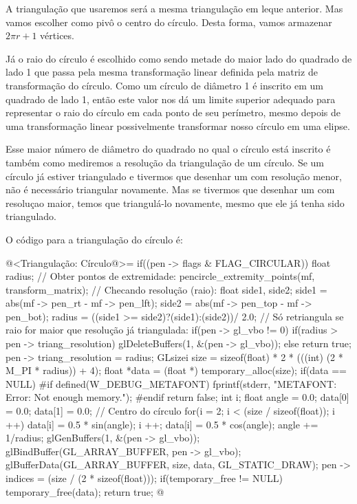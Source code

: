 {{{{{{A triangulação que usaremos será a mesma triangulação em leque
anterior. Mas vamos escolher como pivô o centro do círculo. Desta
forma, vamos armazenar $2\pi r + 1$ vértices.

Já o raio do círculo é escolhido como sendo metade do maior lado do
quadrado de lado 1 que passa pela mesma transformação linear definida
pela matriz de transformação do círculo. Como um círculo de diâmetro 1
é inscrito em um quadrado de lado 1, então este valor nos dá um limite
superior adequado para representar o raio do círculo em cada ponto de
seu perímetro, mesmo depois de uma transformação linear possivelmente
transformar nosso círculo em uma elipse.

Esse maior número de diâmetro do quadrado no qual o círculo está
inscrito é também como mediremos a resolução da triangulação de um
círculo. Se um círculo já estiver triangulado e tivermos que desenhar
um com resolução menor, não é necessário triangular novamente. Mas se
tivermos que desenhar um com resoluçao maior, temos que triangulá-lo
novamente, mesmo que ele já tenha sido triangulado.

O código para a triangulação do círculo é:

\iniciocodigo
@<Triangulação: Círculo@>=
if((pen -> flags & FLAG_CIRCULAR)){
  float radius;
  // Obter pontos de extremidade:
  pencircle_extremity_points(mf, transform_matrix);
  // Checando resolução (raio):
  {
    float side1, side2;
    side1 = abs(mf -> pen_rt - mf -> pen_lft);
    side2 = abs(mf -> pen_top - mf -> pen_bot);
    radius = ((side1 >= side2)?(side1):(side2))/ 2.0;
  }
  // Só retriangula se raio for maior que resolução já triangulada:
  if(pen -> gl_vbo != 0){
    if(radius > pen -> triang_resolution)
      glDeleteBuffers(1, &(pen -> gl_vbo));
    else
      return true;
  }
  pen -> triang_resolution = radius;
  GLsizei size = sizeof(float) * 2 * (((int) (2 * M_PI * radius)) + 4);
  float *data = (float *) temporary_alloc(size);
  if(data == NULL){
#if defined(W_DEBUG_METAFONT)
    fprintf(stderr, "METAFONT: Error: Not enough memory.\n");
#endif
    return false;
  }
  {
    int i;
    float angle = 0.0;
    data[0] = 0.0;
    data[1] = 0.0; // Centro do círculo
    for(i = 2; i < (size / sizeof(float)); i ++){
      data[i] = 0.5 * sin(angle);
      i ++;
      data[i] = 0.5 * cos(angle);
      angle += 1/radius;
    }
  }
  glGenBuffers(1, &(pen -> gl_vbo));
  glBindBuffer(GL_ARRAY_BUFFER, pen -> gl_vbo);
  glBufferData(GL_ARRAY_BUFFER, size, data, GL_STATIC_DRAW);
  pen -> indices = (size / (2 * sizeof(float)));
  if(temporary_free != NULL)
    temporary_free(data);
  return true;
}
@
\fimcodigo

}}}}}}
